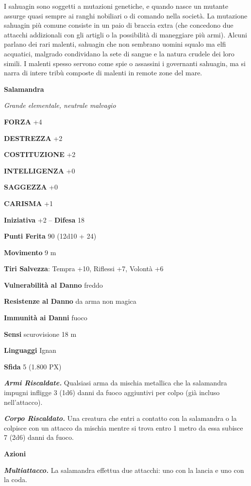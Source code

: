 \begin{multicols}{2}
	I sahuagin sono soggetti a mutazioni genetiche, e quando nasce un mutante assurge quasi sempre ai ranghi nobiliari o di comando nella società. La mutazione sahuagin più comune consiste in un paio di braccia extra (che concedono due attacchi addizionali con gli artigli o la possibilità di maneggiare più armi). Alcuni parlano dei rari malenti, sahuagin che non sembrano uomini squalo ma elfi acquatici, malgrado condividano la sete di sangue e la natura crudele dei loro simili. I malenti spesso servono come spie o assassini i governanti sahuagin, ma si narra di intere tribù composte di malenti in remote zone del mare.


	\medskip{}\textbf{Salamandra}

	\textit{Grande elementale, neutrale malvagio}

	\textbf{FORZA} +4

	\textbf{DESTREZZA} +2

	\textbf{COSTITUZIONE} +2

	\textbf{INTELLIGENZA} +0

	\textbf{SAGGEZZA} +0

	\textbf{CARISMA} +1

	\textbf{Iniziativa} +2 -- \textbf{Difesa} 18

	\textbf{Punti Ferita} 90 (12d10 + 24)

	\textbf{Movimento} 9 m

	\textbf{Tiri Salvezza}: Tempra +10, Riflessi +7, Volontà +6

	\textbf{Vulnerabilità al Danno} freddo

	\textbf{Resistenze al Danno} da arma non magica

	\textbf{Immunità ai Danni} fuoco

	\textbf{Sensi} scurovisione 18 m

	\textbf{Linguaggi} Ignan

	\textbf{Sfida} 5 (1.800 PX)

	\textit{\textbf{Armi Riscaldate.}} Qualsiasi arma da mischia metallica che la salamandra impugni infligge 3 (1d6) danni da fuoco aggiuntivi per colpo (già incluso nell'attacco).

	\textit{\textbf{Corpo Riscaldato.}} Una creatura che entri a contatto con la salamandra o la colpisce con un attacco da mischia mentre si trova entro 1 metro da essa subisce 7 (2d6) danni da fuoco.

	\textbf{Azioni}

	\textit{\textbf{Multiattacco.}} La salamandra effettua due attacchi: uno con la lancia e uno con la coda.


\end{multicols}

